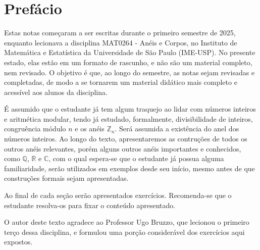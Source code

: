 \chapter{Prefácio}

Estas notas começaram a ser escritas durante o primeiro semestre de 2025, enquanto lecionava a disciplina MAT0264 - Anéis e Corpos, no Instituto de Matemática e Estatística da Universidade de São Paulo (IME-USP).
No presente estado, elas estão em um formato de rascunho, e não são um material completo, nem revisado. O objetivo é que, ao longo do semestre, as notas sejam revisadas e completadas, de modo a se tornarem um material didático mais completo e acessível aos alunos da disciplina.

É assumido que o estudante já tem algum traquejo ao lidar com números inteiros e aritmética modular, tendo já estudado, formalmente, divisibilidade de inteiros, congruência módulo $n$ e os anéis $\mathbb Z_n$.
Será assumida a existência do anel dos números inteiros.
Ao longo do texto, apresentaremos as contruções de todos os outros anéis relevantes, porém alguns outros anéis importantes e conhecidos, como $\mathbb Q$, $\mathbb R$ e $\mathbb C$, com o qual espera-se que o estudante já possua alguma familiaridade, serão utilizados em exemplos desde seu início, mesmo antes de que construções formais sejam apresentadas.

Ao final de cada seção serão apresentados exercícios. Recomenda-se que o estudante resolva-os para fixar o conteúdo apresentado.

O autor deste texto agradece ao Professor Ugo Bruzzo, que lecionou o primeiro terço dessa disciplina, e formulou uma porção considerável dos exercícios aqui expostos.